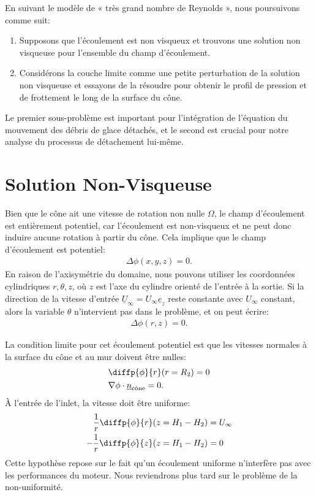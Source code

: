 \documentclass[12pt]{book}
\theoremstyle{bfnote}
\theoremstyle{bfnote}
\begin{document}
En suivant le modèle de « très grand nombre de Reynolds », nous poursuivons comme suit:
\begin{enumerate}
    \item Supposons que l'écoulement est non visqueux et trouvons une solution non visqueuse pour l'ensemble du champ d'écoulement.
    \item Considérons la couche limite comme une petite perturbation de la solution non visqueuse et essayons de la résoudre pour obtenir le profil de pression et de frottement le long de la surface du cône.
\end{enumerate}

Le premier sous-problème est important pour l'intégration de l'équation du mouvement des débris de glace détachés, et le second est crucial pour notre analyse du processus de détachement lui-même.

\section{Solution Non-Visqueuse} %
\label{sec:Solution_Non_Visqueuse}
Bien que le cône ait une vitesse de rotation non nulle $\Omega$, le champ d'écoulement est entièrement potentiel, car l'écoulement est non-visqueux et ne peut donc induire aucune rotation à partir du cône. Cela implique que le champ d'écoulement est potentiel:
\begin{align}
    \Delta \phi(x, y, z) = 0.
\end{align}
En raison de l'axisymétrie du domaine, nous pouvons utiliser les coordonnées cylindriques $r, \theta, z$, où $z$ est l'axe du cylindre orienté de l'entrée à la sortie. Si la direction de la vitesse d'entrée $\underline{U}_\infty = U_\infty \underline{e}_z$ reste constante avec $U_\infty$ constant, alors la variable $\theta$ n'intervient pas dans le problème, et on peut écrire:
\begin{align}
    \Delta \phi(r, z) = 0.
\end{align}

La condition limite pour cet écoulement potentiel est que les vitesses normales à la surface du cône et au mur doivent être nulles:
\begin{align}
    & \diffp{\phi}{r}(r = R_2) = 0\\
    & {\nabla \phi} \cdot \underline{n}_{\text{cône}} = 0.
\end{align}
À l'entrée de l'inlet, la vitesse doit être uniforme:
\begin{align}
    \dfrac{1}{r} \diffp{\phi}{r}(z = H_1 - H_2) & = U_\infty \\
    - \dfrac{1}{r} \diffp{\phi}{z}(z = H_1 - H_2) & = 0
\end{align}
Cette hypothèse repose sur le fait qu'un écoulement uniforme n'interfère pas avec les performances du moteur. Nous reviendrons plus tard sur le problème de la non-uniformité.
\end{document}
